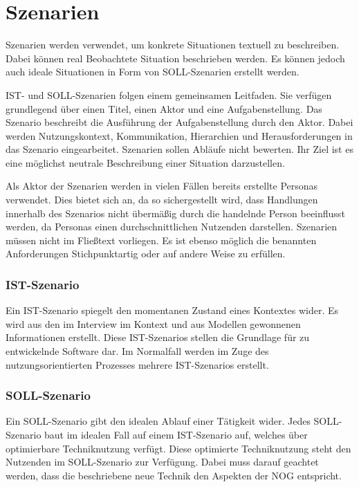 \section{Szenarien}\label{sec:sezenarien}

Szenarien werden verwendet, um konkrete Situationen textuell zu beschreiben.
Dabei können real Beobachtete Situation beschrieben werden.
Es können jedoch auch ideale Situationen in Form von SOLL-Szenarien erstellt werden.

IST- und SOLL-Szenarien folgen einem gemeinsamen Leitfaden.
Sie verfügen grundlegend über einen Titel, einen Aktor und eine Aufgabenstellung.
Das Szenario beschreibt die Ausführung der Aufgabenstellung durch den Aktor.
Dabei werden Nutzungskontext, Kommunikation, Hierarchien und Herausforderungen in das Szenario eingearbeitet.
Szenarien sollen Abläufe nicht bewerten.
Ihr Ziel ist es eine möglichst neutrale Beschreibung einer Situation darzustellen.

Als Aktor der Szenarien werden in vielen Fällen bereits erstellte Personas verwendet.
Dies bietet sich an, da so sichergestellt wird, dass Handlungen innerhalb des Szenarios nicht übermäßig durch die handelnde Person beeinflusst werden, da Personas einen durchschnittlichen Nutzenden darstellen.
Szenarien müssen nicht im Fließtext vorliegen.
Es ist ebenso möglich die benannten Anforderungen Stichpunktartig oder auf andere Weise zu erfüllen.

\subsubsection{IST-Szenario}

Ein IST-Szenario spiegelt den momentanen Zustand eines Kontextes wider.
Es wird aus den im Interview im Kontext und aus Modellen gewonnenen Informationen erstellt.
Diese IST-Szenarios stellen die Grundlage für zu entwickelnde Software dar.
Im Normalfall werden im Zuge des nutzungsorientierten Prozesses mehrere IST-Szenarios erstellt.

\subsubsection{SOLL-Szenario}

Ein SOLL-Szenario gibt den idealen Ablauf einer Tätigkeit wider.
Jedes SOLL-Szenario baut im idealen Fall auf einem IST-Szenario auf, welches über optimierbare Techniknutzung verfügt.
Diese optimierte Techniknutzung steht den Nutzenden im SOLL-Szenario zur Verfügung.
Dabei muss darauf geachtet werden, dass die beschriebene neue Technik den Aspekten der NOG entspricht.